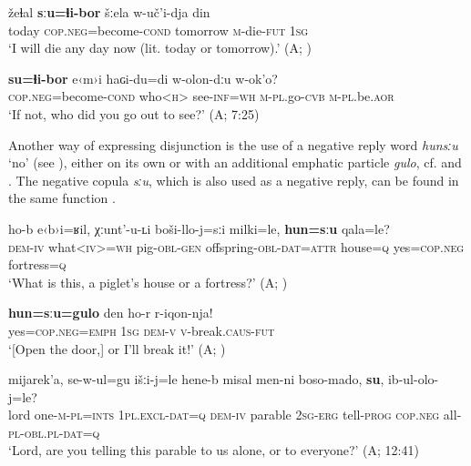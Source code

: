 \documentclass[output=paper,colorlinks=true, citecolor=brown]{langscibook}
\begin{document}
\ea
    \label{ex:and:83} 
    \gll žeɬal \textbf{sːu=ɬi-bor} šːela w-uč’i-dja din\\
          today \textsc{cop.neg}=become-\textsc{cond} tomorrow \textsc{m-}die-\textsc{fut} \textsc{1sg} \\
     ‘I will die any day now (lit. today or tomorrow).’ (A; )
\z 

\ea
    \label{ex:and:84}
    \gll \textbf{su=ɬi-bor} e‹m›i haɢi-du=di w-olon-dːu w-ok’o?\\
          \textsc{cop.neg}=become-\textsc{cond} who<\textsc{h>} see-\textsc{inf=wh} \textsc{m}{}-\textsc{pl}.go-\textsc{cvb} \textsc{m-pl}.be.\textsc{aor} \\
     ‘If not, who did you go out to see?’ (A;  7:25)
\z 

Another way of expressing disjunction is the use of a negative reply word \textit{hunsːu} ‘no’ (see ), either on its own or with an additional emphatic particle \textit{gulo}, cf.  and . The negative copula \textit{sːu}, which is also used as a negative reply, can be found in the same function .

\ea
    \label{ex:and:85}
    \gll ho-b e‹b›i=ʁil, χːunt’{}-u-ʟi boši{}-llo-j=sːi milki=le, \textbf{hun=sːu} qala=le? \\
          \textsc{dem-iv} what<\textsc{iv>=wh} pig\textsc{{}-obl}{}-\textsc{gen} offspring\textsc{{}-obl}{}-\textsc{dat=attr} house=\textsc{q} yes=\textsc{cop.neg} fortress=\textsc{q} \\
    \glt ‘What is this, a piglet’s house or a fortress?’ (A; )
\z 

\ea
    \label{ex:and:86}
    \gll \textbf{hun=sːu=gulo} den ho-r r-iqon-nja!\\
          yes=\textsc{cop.neg=emph} \textsc{1sg} \textsc{dem-v} \textsc{v}{}-break.\textsc{caus-fut} \\ 
    \glt ‘[Open the door,] or I’ll break it!’ (A; ) 
\z 

\ea
    \label{ex:and:87}
    \gll mijarek’a, se-w-ul=gu išːi-j=le hene-b misal men-ni boso-mado, \textbf{su}, ib-ul{}-olo-j=le? \\
          lord one-\textsc{m-pl=ints} \textsc{1pl.excl-dat=q} \textsc{dem-iv} parable \textsc{2sg}{}-\textsc{erg}  tell-\textsc{prog} \textsc{cop.neg} all-\textsc{pl{}-obl.pl{}-dat=q} \\
    \glt ‘Lord, are you telling this parable to us alone, or to everyone?’ (A;  12:41)
\z 
\end{document}
